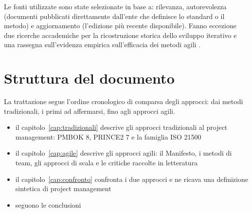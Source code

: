 Le fonti utilizzate sono state selezionate in base a: rilevanza,
autorevolezza (documenti pubblicati direttamente dall'ente che
definisce lo standard o il metodo) e aggiornamento (l'edizione pi\`u recente
disponibile). Fanno eccezione due ricerche accademiche per la ricostruzione storica dello
sviluppo iterativo \cite{larman2003} e una rassegna
sull'evidenza empirica sull'efficacia dei metodi agili \cite{dyba2008}.

\section*{Struttura del documento}

La trattazione segue l'ordine cronologico di comparsa degli approcci:
dai metodi tradizionali, i primi ad affermarsi, fino agli approcci agili.

\begin{itemize}
    \item il capitolo~\ref{cap:tradizionali} descrive gli approcci
tradizionali al project management: PMBOK 8, PRINCE2 7 e la famiglia ISO
21500

    \item il capitolo~\ref{cap:agile} descrive gli approcci agili: il
Manifesto, i metodi di team, gli approcci di scala e le critiche raccolte in
letteratura

    \item il capitolo~\ref{cap:confronto} confronta i due approcci e ne
ricava una definizione sintetica di project management

    \item seguono le conclusioni
\end{itemize}
